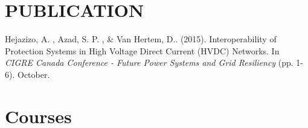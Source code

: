\section{PUBLICATION}
Hejazizo, A. , Azad, S. P. , \& Van Hertem, D.. (2015). Interoperability of Protection Systems in High Voltage Direct Current (HVDC) Networks. In \textit{CIGRE Canada Conference - Future Power Systems and Grid Resiliency} (pp. 1-6). October.



\section{Courses}
